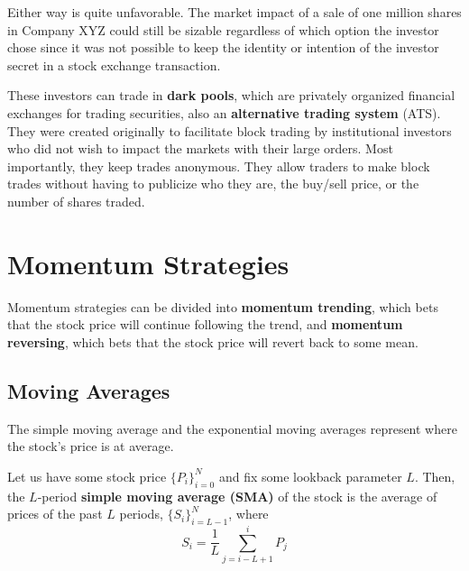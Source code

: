 \documentclass{article}
\begin{document}
    Either way is quite unfavorable. The market impact of a sale of one million shares in Company XYZ could still be sizable regardless of which option the investor chose since it was not possible to keep the identity or intention of the investor secret in a stock exchange transaction. 

    These investors can trade in \textbf{dark pools}, which are privately organized financial exchanges for trading securities, also an \textbf{alternative trading system} (ATS). They were created originally to facilitate block trading by institutional investors who did not wish to impact the markets with their large orders. Most importantly, they keep trades anonymous. They allow traders to make block trades without having to publicize who they are, the buy/sell price, or the number of shares traded. 

\section{Momentum Strategies}

  Momentum strategies can be divided into \textbf{momentum trending}, which bets that the stock price will continue following the trend, and \textbf{momentum reversing}, which bets that the stock price will revert back to some mean. 

  \subsection{Moving Averages}

    The simple moving average and the exponential moving averages represent where the stock's price is at average. 

    \begin{definition}
      Let us have some stock price $\{P_i\}_{i=0}^N$ and fix some lookback parameter $L$. Then, the $L$-period \textbf{simple moving average (SMA)} of the stock is the average of prices of the past $L$ periods, $\{S_i\}_{i=L-1}^N$, where 
      \[S_i = \frac{1}{L} \sum_{j=i-L + 1}^i P_j\]
    \end{definition}

    \begin{definition}

    \end{definition}
\end{document}
